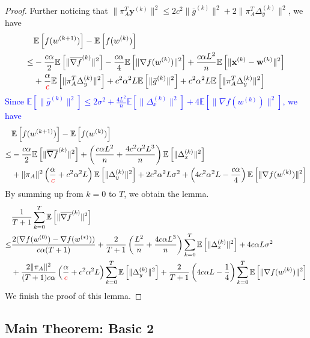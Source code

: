 \documentclass{article}
\newcommand{\vw}{{\mathbf{w}}}
\newcommand{\vx}{{\mathbf{x}}}
\newcommand{\vy}{{\mathbf{y}}}
\newcommand{\EE}[1]{\mathbb{E}\left[#1\right]}
\newcommand{\norm}[1]{\| #1 \|}
\begin{document}
\begin{proof}
Further noticing that $\norm{\pi_A^T\vy^{(k)}}^2\leq 2c^2\norm{\bar{g}^{(k)}}^2+2\norm{\pi_A^T\Delta_{y}^{(k)}}^2$, we have
  \begin{align*}
    &\EE{f(w^{(k+1)})}-\EE{f(w^{(k)})}\\ 
    \leq &-\frac{c\alpha}{2}\EE{\norm{\overline{\nabla f}^{(k)}}^2}-\frac{c\alpha}{4}\EE{\norm{\nabla f(w^{(k)})}^2}+\frac{c\alpha L^2}{n}\EE{\norm{\vx^{(k)}-\vw^{(k)}}^2}\\&+\frac{\alpha}{\textcolor{red}{c}}\EE{\norm{\pi_{A}^T\Delta_{y}^{(k)}}^2}+c^2\alpha^2L\EE{\norm{\bar{g}^{(k)}}^2}+c^2\alpha^2L\EE{\norm{\pi_A^T\Delta_{y}^{(k)}}^2}
  \end{align*}
  \textcolor{blue}{Since $\EE{\norm{\bar{g}^{(k)}}^2}\leq 2\sigma^2+\frac{4L^2}{n}\EE{\norm{\Delta_x^{(k)}}^2}+4\EE{\norm{\nabla f(w^{(k)})}^2}$, we have}
\begin{align*}
  &\EE{f(w^{(k+1)})}-\EE{f(w^{(k)})}\\ 
    \leq &-\frac{c\alpha}{2}\EE{\norm{\overline{\nabla f}^{(k)}}^2}+\left(\frac{c\alpha L^2}{n}+\frac{4c^2\alpha^2L^3}{n}\right)\EE{\norm{\Delta_x^{(k)}}^2}\\&+\norm{\pi_A}^2\left(\frac{\alpha}{\textcolor{red}{c}}+c^2\alpha^2L\right)\EE{\norm{\Delta_{y}^{(k)}}^2}+2c^2\alpha^2L\sigma^2+\left(4c^2\alpha^2L-\frac{c\alpha}{4}\right)\EE{\norm{\nabla f(w^{(k)})}^2}
\end{align*}
By summing up from $k=0$ to $T$, we obtain the lemma.
\begin{align*}
  &\frac{1}{T+1}\sum_{k=0}^T\EE{\norm{\overline{\nabla f}^{(k)}}^2}\\ \leq& \frac{2(\nabla f(w^{(0)})-\nabla f(w^{(*)}))}{c\alpha(T+1)}+\frac{2}{T+1}\left(\frac{L^2}{n}+\frac{4c\alpha L^3}{n}\right)\sum_{k=0}^T\EE{\norm{\Delta_x^{(k)}}^2}+4c\alpha L\sigma^2\\&+\frac{2\norm{\pi_A}^2}{(T+1)c\alpha}\left(\frac{\alpha}{\textcolor{red}{c}}+c^2\alpha^2L\right)\sum_{k=0}^T\EE{\norm{\Delta_{y}^{(k)}}^2}+\frac{2}{T+1}\left(4c\alpha L-\frac{1}{4}\right)\sum_{k=0}^T\EE{\norm{\nabla f(w^{(k)})}^2}
\end{align*}
We finish the proof of this lemma.
\end{proof}

\subsection{Main Theorem: Basic 2}
\end{document}
